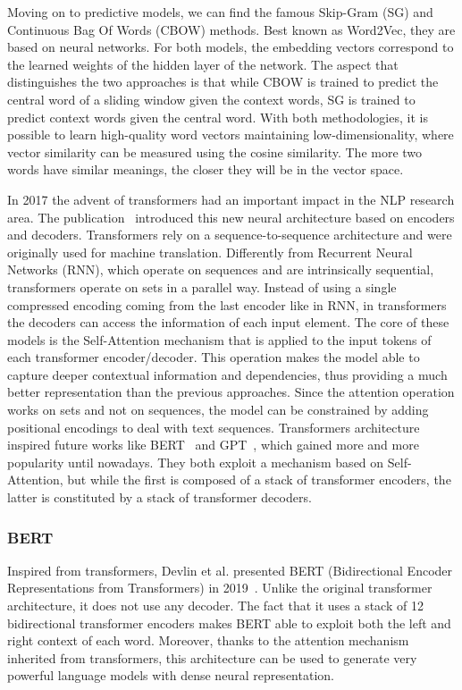 Moving on to predictive models, we can find the famous Skip-Gram (SG) and Continuous Bag Of Words (CBOW) methods. Best known as Word2Vec, they are based on neural networks. For both models, the embedding vectors correspond to the learned weights of the hidden layer of the network. The aspect that distinguishes the two approaches is that while CBOW is trained to predict the central word of a sliding window given the context words, SG is trained to predict context words given the central word. With both methodologies, it is possible to learn high-quality word vectors maintaining low-dimensionality, where vector similarity can be measured using the cosine similarity. The more two words have similar meanings, the closer they will be in the vector space.

In 2017 the advent of transformers had an important impact in the NLP research area. The publication~\cite{vaswani2017attention} introduced this new neural architecture based on encoders and decoders. Transformers rely on a sequence-to-sequence architecture and were originally used for machine translation. Differently from Recurrent Neural Networks (RNN), which operate on sequences and are intrinsically sequential, transformers operate on sets in a parallel way. Instead of using a single compressed encoding coming from the last encoder like in RNN, in transformers the decoders can access the information of each input element. The core of these models is the Self-Attention mechanism that is applied to the input tokens of each transformer encoder/decoder. This operation makes the model able to capture deeper contextual information and dependencies, thus providing a much better representation than the previous approaches. Since the attention operation works on sets and not on sequences, the model can be constrained by adding positional encodings to deal with text sequences. Transformers architecture inspired future works like BERT~\cite{devlin-etal-2019-bert} and GPT~\cite{gpt}, which gained more and more popularity until nowadays. They both exploit a mechanism based on Self-Attention, but while the first is composed of a stack of transformer encoders, the latter is constituted by a stack of transformer decoders.

\subsubsection{BERT}
Inspired from transformers, Devlin et al. presented BERT (Bidirectional Encoder Representations from Transformers) in 2019~\cite{devlin-etal-2019-bert}. Unlike the original transformer architecture, it does not use any decoder. The fact that it uses a stack of 12 bidirectional transformer encoders makes BERT able to exploit both the left and right context of each word. Moreover, thanks to the attention mechanism inherited from transformers, this architecture can be used to generate very powerful language models with dense neural representation.

